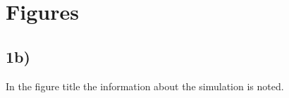\section{Figures}
\subsection{1b)}\label{app:fig}

In the figure title the information about the simulation is noted. 